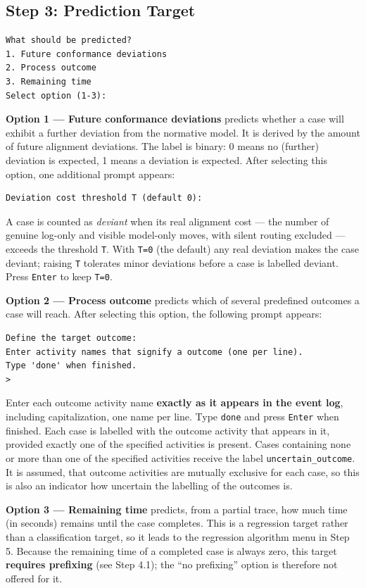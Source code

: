 \documentclass[12pt,a4paper]{article}
\begin{document}
\subsection{Step 3: Prediction Target}
\begin{verbatim}
What should be predicted?
1. Future conformance deviations
2. Process outcome
3. Remaining time
Select option (1-3):
\end{verbatim}

\textbf{Option 1 --- Future conformance deviations} predicts whether a case will exhibit a further deviation from the normative model. It is derived by the amount of future alignment deviations. The label is binary: 0 means no (further) deviation is expected, 1 means a deviation is expected. After selecting this option, one additional prompt appears:
\begin{verbatim}
Deviation cost threshold T (default 0):
\end{verbatim}
A case is counted as \emph{deviant} when its real alignment cost --- the number of genuine log-only and visible model-only moves, with silent routing excluded --- exceeds the threshold \texttt{T}. With \texttt{T=0} (the default) any real deviation makes the case deviant; raising \texttt{T} tolerates minor deviations before a case is labelled deviant. Press \texttt{Enter} to keep \texttt{T=0}.

\textbf{Option 2 --- Process outcome} predicts which of several predefined outcomes a case will reach. After selecting this option, the following prompt appears:
\begin{verbatim}
Define the target outcome:
Enter activity names that signify a outcome (one per line).
Type 'done' when finished.
>
\end{verbatim}
Enter each outcome activity name \textbf{exactly as it appears in the event log}, including capitalization, one name per line. Type \texttt{done} and press \texttt{Enter} when finished. Each case is labelled with the outcome activity that appears in it, provided exactly one of the specified activities is present. Cases containing none or more than one of the specified activities receive the label \verb|uncertain_outcome|. It is assumed, that outcome activities are mutually exclusive for each case, so this is also an indicator how uncertain the labelling of the outcomes is.

\textbf{Option 3 --- Remaining time} predicts, from a partial trace, how much time (in seconds) remains until the case completes. This is a regression target rather than a classification target, so it leads to the regression algorithm menu in Step 5. Because the remaining time of a completed case is always zero, this target \textbf{requires prefixing} (see Step 4.1); the ``no prefixing'' option is therefore not offered for it.
\end{document}
